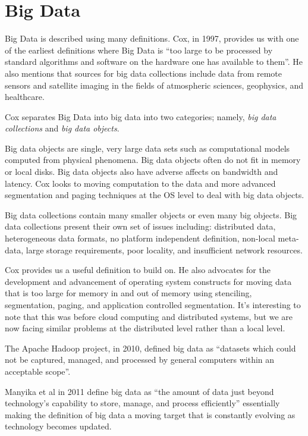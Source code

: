 \documentclass[]{article}
\begin{document}
\section{Big Data} \label{sec:big-sensor-data}
Big Data is described using many definitions. Cox, in 1997\cite{cox_managing_1997}, provides us with one of the earliest definitions where Big Data is ``too large to be processed by standard algorithms and software on the hardware one has available to them''. He also mentions that sources for big data collections include data from remote sensors and satellite imaging in the fields of atmospheric sciences, geophysics, and healthcare.

Cox separates Big Data into big data into two categories; namely, \textit{big data collections} and \textit{big data objects}. 

Big data objects are single, very large data sets such as computational models computed from physical phenomena. Big data objects often do not fit in memory or local disks. Big data objects also have adverse affects on bandwidth and latency. Cox looks to moving computation to the data and more advanced segmentation and paging techniques at the OS level to deal with big data objects.

Big data collections contain many smaller objects or even many big objects. Big data collections present their own set of issues including: distributed data, heterogeneous data formats, no platform independent definition, non-local meta-data, large storage requirements, poor locality, and insufficient network resources. 

Cox provides us a useful definition to build on. He also advocates for the development and advancement of operating system constructs for moving data that is too large for memory in and out of memory using stenciling, segmentation, paging, and application controlled segmentation. It's interesting to note that this was before cloud computing and distributed systems, but we are now facing similar problems at the distributed level rather than a local level.

The Apache Hadoop project, in 2010, defined big data as ``datasets which could not be captured, managed, and processed by general computers within an acceptable scope''\cite{chen_big_2014}.

Manyika et al\cite{manyika} in 2011 define big data as ``the amount of data just beyond technology's capability to store, manage, and process efficiently'' essentially making the definition of big data a moving target that is constantly evolving as technology becomes updated.
\end{document}
